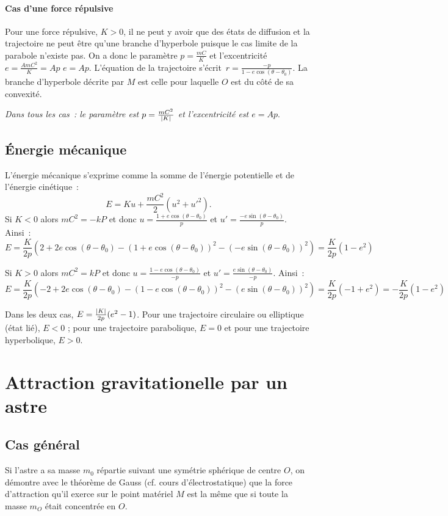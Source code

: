 \paragraph{Cas d'une force répulsive}
Pour une force répulsive, \(K > 0\), il ne peut y avoir que des états de 
diffusion et la trajectoire ne peut être qu'une branche d'hyperbole puisque le 
cas limite de la parabole n'existe pas. On a donc le paramètre \(p = 
\frac{mC}{K}\) et l'excentricité \(e = \frac{AmC^2}{K} = Ap\) \(e = Ap\). 
L'équation de la trajectoire s'écrit~\(r = \frac{-p}{1 - e\cos(\theta - 
\theta_0)}\). La branche d'hyperbole décrite par \(M\) est celle pour laquelle 
\(O\) est du côté de sa convexité.

\emph{Dans tous les cas~: le paramètre est \(p=\frac{mC^2}{\left\lvert K\right\rvert}\) et 
l'excentricité est \(e = Ap\)}.

\subsection{Énergie mécanique}
L'énergie mécanique s'exprime comme la somme de l'énergie potentielle et de 
l'énergie cinétique~: \[E = Ku + \frac{mC^2}{2}(u^2 + {u'}^2).\]
Si \(K<0\) alors \(mC^2 = -kP\) et donc \(u = \frac{1+e\cos(\theta - 
\theta_0)}{p}\) et \(u' = \frac{-e\sin(\theta - \theta_0)}{p}\). Ainsi~:
\[E = \frac{K}{2p}\left(2+2e\cos(\theta-\theta_0) - 
{(1+e\cos(\theta-\theta_0))}^2 - {(-e\sin(\theta-\theta_0))}^2\right) = 
\frac{K}{2p}(1-e^2)\]

Si \(K>0\) alors \(mC^2 = kP\) et donc \(u = \frac{1-e\cos(\theta - 
\theta_0)}{-p}\) et \(u' = \frac{e\sin(\theta - \theta_0)}{-p}\). Ainsi~:
\[E = \frac{K}{2p}\left(-2+2e\cos(\theta-\theta_0) - 
{(1-e\cos(\theta-\theta_0))}^2 - {(e\sin(\theta-\theta_0))}^2\right) = 
\frac{K}{2p}(-1+e^2) = -\frac{K}{2p}(1-e^2)\]

Dans les deux cas, \(E = \frac{\left\lvert K\right\rvert}{2p}(e^2-1)\). Pour une trajectoire 
circulaire ou elliptique (état lié), \(E<0\) ; pour une trajectoire 
parabolique, \(E=0\) et pour une trajectoire hyperbolique, \(E>0\).

\section{Attraction gravitationelle par un astre}
\subsection{Cas général}

Si l'astre a sa masse \(m_0\) répartie suivant une symétrie sphérique de centre 
\(O\), on démontre avec le théorème de Gauss (cf. cours d'électrostatique) que 
la force d'attraction qu'il exerce sur le point matériel \(M\) est la même que 
si toute la masse \(m_O\) était concentrée en \(O\).

